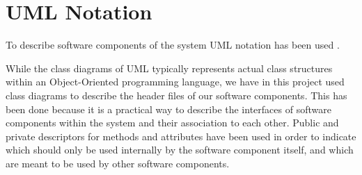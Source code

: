 \section{UML Notation}
\label{section:UMLNotation}

To describe software components of the system UML notation has been used \cite{UML}.

While the class diagrams of UML typically represents actual class structures within an Object-Oriented programming language, we have in this project used class diagrams to describe the header files of our software components. This has been done because it is a practical way to describe the interfaces of software components within the system and their association to each other. Public and private descriptors for methods and attributes have been used in order to indicate which should only be used internally by the software component itself, and which are meant to be used by other software components.